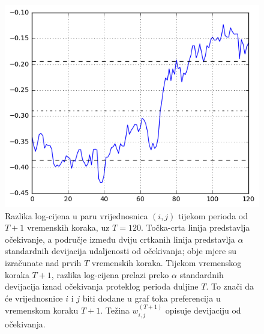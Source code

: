\documentclass[lmodern, utf8, diplomski, numeric]{fer}
\begin{document}
  \begin{figure}[htb]
    \centering
    \includegraphics[width=0.9\columnwidth]{graphics/deviation-magnitude.png}
    \caption{
       Razlika log-cijena u paru vrijednosnica $(i,j)$ tijekom perioda od $T + 1$ vremenskih koraka, uz $T = 120$.
       Točka-crta linija predstavlja očekivanje, a područje između dviju crtkanih linija predstavlja $\alpha$ standardnih devijacija udaljenosti od očekivanja; obje mjere su izračunate nad prvih $T$ vremenskih koraka.
       Tijekom vremenskog koraka $T + 1$, razlika log-cijena prelazi preko $\alpha$ standardnih devijacija iznad očekivanja proteklog perioda duljine $T$.
       To znači da će vrijednosnice $i$ i $j$ biti dodane u graf toka preferencija u vremenskom koraku $T + 1$.
       Težina $w_{i,j}^{(T+1)}$ opisuje devijaciju od očekivanja.
    }
    \label{fig:devmag}
  \end{figure}
  
\end{document}
